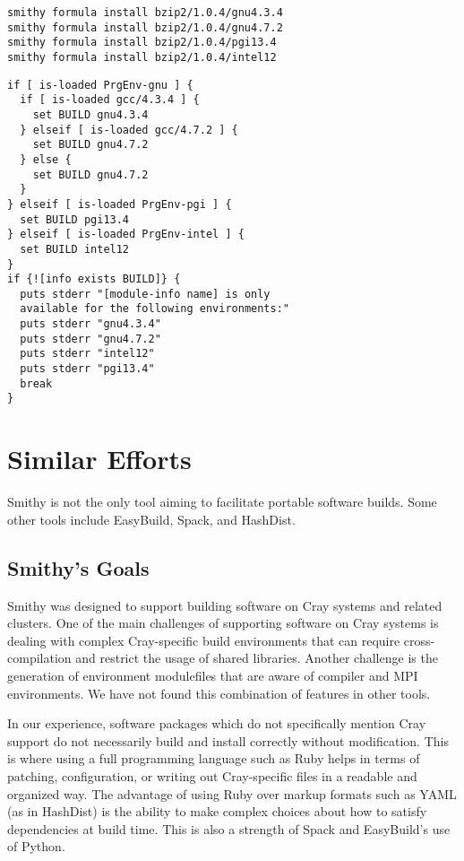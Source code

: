 \documentclass{acm_proc_article-sp}
\begin{document}
\begin{quoting}[leftmargin=0pt]
\begin{verbatim}
smithy formula install bzip2/1.0.4/gnu4.3.4
smithy formula install bzip2/1.0.4/gnu4.7.2
smithy formula install bzip2/1.0.4/pgi13.4
smithy formula install bzip2/1.0.4/intel12
\end{verbatim}
\end{quoting}

\begin{quoting}[leftmargin=0pt]
\begin{verbatim}
if [ is-loaded PrgEnv-gnu ] {
  if [ is-loaded gcc/4.3.4 ] {
    set BUILD gnu4.3.4
  } elseif [ is-loaded gcc/4.7.2 ] {
    set BUILD gnu4.7.2
  } else {
    set BUILD gnu4.7.2
  }
} elseif [ is-loaded PrgEnv-pgi ] {
  set BUILD pgi13.4
} elseif [ is-loaded PrgEnv-intel ] {
  set BUILD intel12
}
if {![info exists BUILD]} {
  puts stderr "[module-info name] is only
  available for the following environments:"
  puts stderr "gnu4.3.4"
  puts stderr "gnu4.7.2"
  puts stderr "intel12"
  puts stderr "pgi13.4"
  break
}
\end{verbatim}
\end{quoting}

\section{Similar Efforts}

Smithy is not the only tool aiming to facilitate portable software builds. Some
other tools include EasyBuild\cite{EasyBuild}, Spack, and HashDist.

\subsection{Smithy's Goals}

Smithy was designed to support building software on Cray systems and related
clusters. One of the main challenges of supporting software on Cray systems is
dealing with complex Cray-specific build environments that can require
cross-compilation and restrict the usage of shared libraries. Another challenge
is the generation of environment modulefiles that are aware of compiler and MPI
environments. We have not found this combination of features in other tools.

In our experience, software packages which do not specifically mention Cray
support do not necessarily build and install correctly without
modification. This is where using a full programming language such as Ruby helps
in terms of patching, configuration, or writing out Cray-specific files in a
readable and organized way. The advantage of using Ruby over markup formats such
as YAML (as in HashDist) is the ability to make complex choices about how to
satisfy dependencies at build time. This is also a strength of Spack and
EasyBuild's use of Python.
\end{document}
